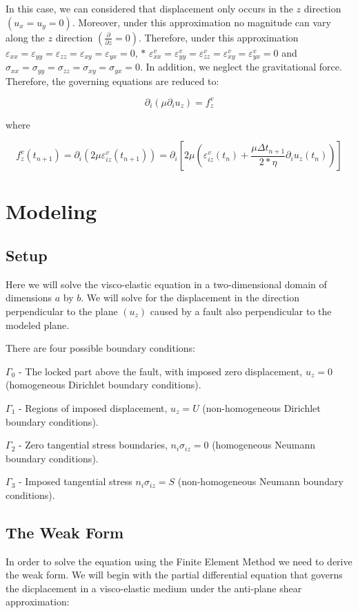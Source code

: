  In this case, we can considered that displacement only occurs in the $z$ direction $ (u_{x}=u_{y}=0) $. Moreover, under this approximation no magnitude can vary along the $ z $ direction $(\frac{\partial}{\partial z}=0)$. Therefore, under this approximation $ \varepsilon_{xx} = \varepsilon_{yy} = \varepsilon_{zz} = \varepsilon_{xy} = \varepsilon_{yx}=0$, $\ast$ $ \varepsilon^v_{xx} = \varepsilon^v_{yy} = \varepsilon^v_{zz} = \varepsilon^v_{xy} = \varepsilon^v_{yx} = 0 $ and $ \sigma_{xx} = \sigma_{yy} = \sigma_{zz} = \sigma_{xy} = \sigma_{yx} = 0 $. In addition, we neglect the gravitational force. Therefore, the governing equations are reduced to\-:

\[ \partial_i \left( \mu \partial_i u_z \right) = f^v_z \]

where

\[ f^v_z(t_{n+1}) = \partial_i \left( 2\mu \varepsilon^v_{iz}(t_{n+1}) \right) = \partial_i \left[ 2 \mu \left(\varepsilon^v_{iz}(t_n) + \frac{\mu \Delta t_{n+1}}{2 * \eta} \partial_i u_z(t_n) \right) \right] \]\hypertarget{index_model}{}\section{Modeling}\label{index_model}
\hypertarget{index_setup}{}\subsection{Setup}\label{index_setup}
Here we will solve the visco-\/elastic equation in a two-\/dimensional domain of dimensions $a$ by $b$. We will solve for the displacement in the direction perpendicular to the plane $(u_z)$ caused by a fault also perpendicular to the modeled plane.

There are four possible boundary conditions\-:


\begin{DoxyItemize}
\item $\Gamma_0$ -\/ The locked part above the fault, with imposed zero displacement, $u_z=0$ (homogeneous Dirichlet boundary conditions).
\item $\Gamma_1$ -\/ Regions of imposed displacement, $u_z=U$ (non-\/homogeneous Dirichlet boundary conditions).
\item $\Gamma_2$ -\/ Zero tangential stress boundaries, $ n_i \sigma_{iz} = 0 $ (homogeneous Neumann boundary conditions).
\item $\Gamma_3$ -\/ Imposed tangential stress $ n_i \sigma_{iz} = S$ (non-\/homogeneous Neumann boundary conditions).
\end{DoxyItemize}\hypertarget{index_weak_form}{}\subsection{The Weak Form}\label{index_weak_form}
In order to solve the equation using the Finite Element Method we need to derive the weak form. We will begin with the partial differential equation that governs the dicplacement in a visco-\/elastic medium under the anti-\/plane shear approximation\-:

